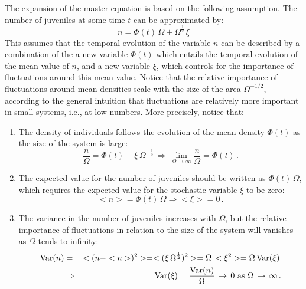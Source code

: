 The expansion of the master equation is based on the following assumption. The number of juveniles at some time $t$ can be approximated by:
\begin{equation}
	\label{central}
	n = \Phi(t)\,\Omega + \Omega^{\frac{1}{2}}\,\xi
\end{equation}
This assumes that the temporal evolution of the variable $n$ can be described by a combination of the a new variable $\Phi(t)$ which entails the temporal evolution of the mean value of $n$, and a new variable $\xi$, which controls for the importance of fluctuations around this mean value. Notice that the relative importance of fluctuations around mean densities scale with the size of the area $\Omega^{-1/2}$, according to the general intuition that fluctuations are relatively more important in small systems, i.e., at low numbers. More precisely, notice that:
\begin{enumerate}
	\item The density of individuals follows the evolution of the mean density $\Phi(t)$ as the size of the system is large:
	\begin{equation}
		\frac{n}{\Omega}=\Phi(t)+\xi\,\Omega^{-\frac{1}{2}}\, \Rightarrow\, \lim_{\Omega \to \infty}\frac{n}{\Omega}=\Phi(t)\,.
	\end{equation}    
	\item The expected value for the number of juveniles should be written as $\Phi(t)\,\Omega$, which requires the expected value for the stochastic variable $\xi$ to be zero:
	\begin{equation}
		<n> = \Phi(t)\,\Omega \Rightarrow <\xi>=0\,.
	\end{equation} 
	\item The variance in the number of juveniles increases with $\Omega$, but the relative importance of fluctuations in relation to the size of the system will vanishes  as $\Omega$ tends to infinity:
	\begin{eqnarray}
		\textup{Var}(n)&=&<(n-<n>)^2>=<(\xi\,\Omega^{\frac{1}{2}})^2> = \Omega\,<\xi^2>=\Omega\,\textup{Var}(\xi)\,\nonumber\\
		&\Rightarrow& \textup{Var}(\xi)=\frac{\textup{Var}(n)}{\Omega}\,\to\,0\,\,\textup{as}\,\,\Omega\,\to\,\infty\,. 
	\end{eqnarray}
\end{enumerate}

